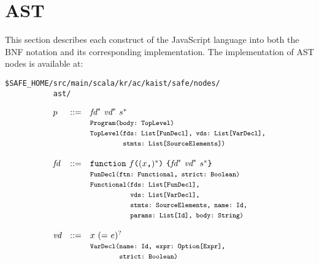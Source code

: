 \chapter{AST}
This section describes each construct of the JavaScript language
into both the BNF notation and its corresponding implementation.
The implementation of AST nodes is available at:
\begin{verbatim}
$SAFE_HOME/src/main/scala/kr/ac/kaist/safe/nodes/
           ast/
\end{verbatim}
\small
\[
\begin{array}{llll}
\pgm & ::=  & \fd^*\ \vd^*\ \stmt^* \\
&& \mtt{Program(body:~TopLevel)}\\
    &&\mtt{TopLevel(fds:~List[FunDecl], vds:~List[VarDecl],}\\
&&\mtt{\phantom{TopLevel(}stmts:~List[SourceElements])}\\\\

\fd &::=& {\tt function} \ f \verb+(+(x\verb+,+)^*\verb+)+ \ \verb+{+\fd^*\ \vd^*\ \stmt^*\verb+}+\\
&& \mtt{FunDecl(ftn:~Functional, strict:~Boolean)}\\
&& \mtt{Functional(fds:~List[FunDecl],}\\
&&\mtt{\phantom{Functional(}vds:~List[VarDecl],}\\
&&\mtt{\phantom{Functional(}stmts:~SourceElements, name:~Id,}\\
&&\mtt{\phantom{Functional(}params:~List[Id], body:~String)}\\\\

\vd &::=& x \ ({\tt =} \ \expr)^? \\
&& \mtt{VarDecl(name:~Id, expr:~Option[Expr],}\\
&& \mtt{\phantom{VarDecl(}strict:~Boolean)}\\\\


\end{array}\]
